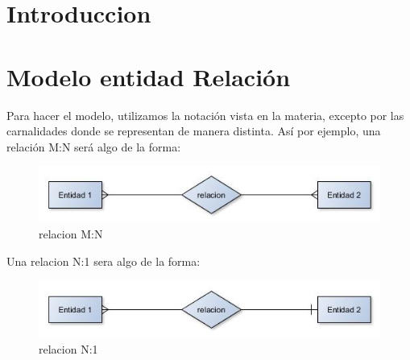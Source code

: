 \documentclass[10pt, a4paper]{article}
\author{Base de Datos, DC, UBA.}
\date{}
\title{}
\begin{document}
\thispagestyle{empty}
\titulo{}
\maketitle

\tableofcontents

\NoCaptionOfAlgo
\DontPrintSemicolon
\SetAlFnt{\ttfamily}

\newpage

\section{Introduccion}

	
 
\section{Modelo entidad Relaci\'on}

Para hacer el modelo, utilizamos la notaci\'on vista en la materia, excepto por las carnalidades donde se representan de manera distinta. As\'i por ejemplo, una relaci\'on M:N ser\'a algo de la forma:

\begin{figure}[ht]
  \begin{center}
    \includegraphics[scale=.75]{./imagenes/ejrelacion.jpg}
    \caption{relacion M:N} 
    \label{fig:graficomn}
  \end{center}
\end{figure}

Una relacion N:1 sera algo de la forma:

\begin{figure}[ht]
  \begin{center}
    \includegraphics[scale=.75]{./imagenes/ejrelacion2.jpg}
    \caption{relacion N:1} 
    \label{fig:grafico}
  \end{center}
\end{figure}
\end{document}

